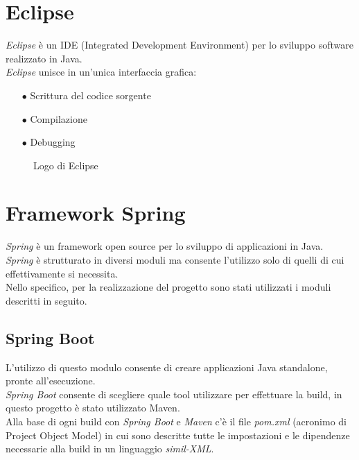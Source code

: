 \section{Eclipse}
\emph{Eclipse} è un IDE (Integrated Development Environment) per lo sviluppo software realizzato in Java.\\
\emph{Eclipse} unisce in un’unica interfaccia grafica:
\begin{itemize}
	\item[$\bullet$]Scrittura del codice sorgente
	\item[$\bullet$]Compilazione
	\item[$\bullet$]Debugging
\end{itemize}
\begin{figure}[ht]
	\centering
	\caption{Logo di Eclipse}
	\label{fig:one}
\end{figure}

\section{Framework Spring}
\emph{Spring} è un framework open source per lo sviluppo di applicazioni in Java.\\
\emph{Spring} è strutturato in diversi moduli ma consente l'utilizzo solo di quelli di cui effettivamente si necessita.\\
Nello specifico, per la realizzazione del progetto sono stati utilizzati i moduli descritti in seguito.
\subsection{Spring Boot}
L’utilizzo di questo modulo consente di creare applicazioni Java standalone, pronte all’esecuzione.\\
\emph{Spring Boot} consente di scegliere quale tool utilizzare per effettuare la build, in questo progetto è stato utilizzato Maven.\\
Alla base di ogni build con \emph{Spring Boot} e \emph{Maven} c’è il file \emph{pom.xml} (acronimo di Project Object Model) in cui sono descritte tutte le impostazioni e le dipendenze necessarie alla build in un linguaggio \emph{simil-XML}.
